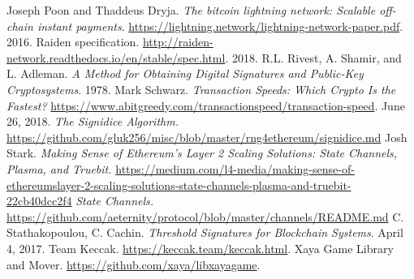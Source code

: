 \documentclass[tikz, 12pt]{article}
\theoremstyle{definition}
\theoremstyle{remark}
\begin{document}
\begin{thebibliography}{9}
 Joseph Poon and Thaddeus Dryja. \emph{The bitcoin lightning network: Scalable off-chain instant payments}. \url{https://lightning.network/lightning-network-paper.pdf}. 2016.
 Raiden specification. \url{http://raiden-network.readthedocs.io/en/stable/spec.html}. 2018.
 R.L. Rivest, A. Shamir, and L. Adleman. \emph{A Method for Obtaining Digital Signatures and Public-Key Cryptosystems}. 1978.
 Mark Schwarz. \emph{Transaction Speeds: Which Crypto Is the Fastest?} \url{https://www.abitgreedy.com/transactionspeed/transaction-speed}. June 26, 2018.
 \emph{The Signidice Algorithm.} \url{https://github.com/gluk256/misc/blob/master/rng4ethereum/signidice.md}
 Josh Stark. \emph{Making Sense of Ethereum’s Layer 2 Scaling Solutions: State Channels, Plasma, and Truebit.} \url{https://medium.com/l4-media/making-sense-of-ethereumslayer-2-scaling-solutions-state-channels-plasma-and-truebit-22cb40dcc2f4}
 \emph{State Channels.} \url{https://github.com/aeternity/protocol/blob/master/channels/README.md}
 C. Stathakopoulou, C. Cachin. \emph{Threshold Signatures for Blockchain Systems}. April 4, 2017. 
 Team Keccak. \url{https://keccak.team/keccak.html}.
 Xaya Game Library and Mover. \url{https://github.com/xaya/libxayagame}.
\end{thebibliography}


		
\end{document}
